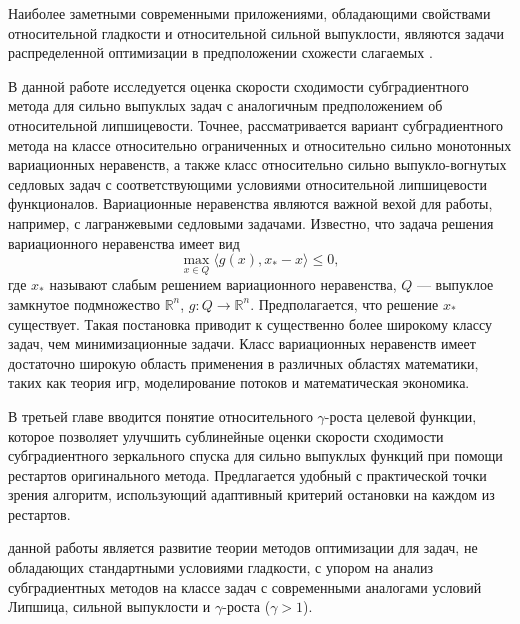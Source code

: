Наиболее заметными современными приложениями, обладающими свойствами относительной гладкости и относительной сильной выпуклости, являются задачи распределенной оптимизации в предположении схожести слагаемых \cite{Hendr}. 

В данной работе исследуется оценка скорости сходимости субградиентного метода для сильно выпуклых задач с аналогичным предположением об относительной липшицевости. Точнее, рассматривается вариант субградиентного метода на классе относительно ограниченных и относительно сильно монотонных вариационных неравенств, а также класс относительно сильно выпукло-вогнутых седловых задач с соответствующими условиями относительной липшицевости функционалов. Вариационные неравенства являются важной вехой для работы, например, с лагранжевыми седловыми задачами. Известно, что задача решения вариационного неравенства имеет вид
$$
    \max_{x \in Q} \langle g(x), x_* - x \rangle \leq 0,
$$
где $x_*$ называют слабым решением вариационного неравенства, $Q$ --- выпуклое замкнутое подмножество $\mathbb{R}^n$, $g: Q \longrightarrow \mathbb{R}^n$. Предполагается, что решение $x_*$ существует. Такая постановка приводит к существенно более широкому классу задач, чем минимизационные задачи. Класс вариационных неравенств имеет достаточно широкую область применения в различных областях математики, таких как теория игр, моделирование потоков и математическая экономика. 

В третьей главе вводится понятие относительного $\gamma$-роста целевой функции, которое позволяет улучшить сублинейные оценки скорости сходимости субградиентного зеркального спуска для сильно выпуклых функций при помощи рестартов оригинального метода. Предлагается удобный с практической точки зрения алгоритм, использующий адаптивный критерий остановки на каждом из рестартов. 


{\aim} данной работы является развитие теории методов оптимизации для задач, не обладающих стандартными условиями гладкости, с упором на анализ субградиентных методов на классе задач с современными аналогами условий Липшица, сильной выпуклости и $\gamma$-роста ($\gamma > 1$).

